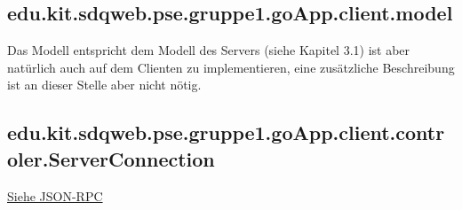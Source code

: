 	
	\subsection{edu.kit.sdqweb.pse.gruppe1.goApp.client.model}
	Das Modell entspricht dem Modell des Servers (siehe Kapitel 3.1) ist aber natürlich auch auf dem Clienten zu implementieren, eine zusätzliche Beschreibung ist an dieser Stelle aber nicht nötig.
	
	\subsection{edu.kit.sdqweb.pse.gruppe1.goApp.client.controler.ServerConnection}
	\hyperlink{ServerConnection}{Siehe JSON-RPC}